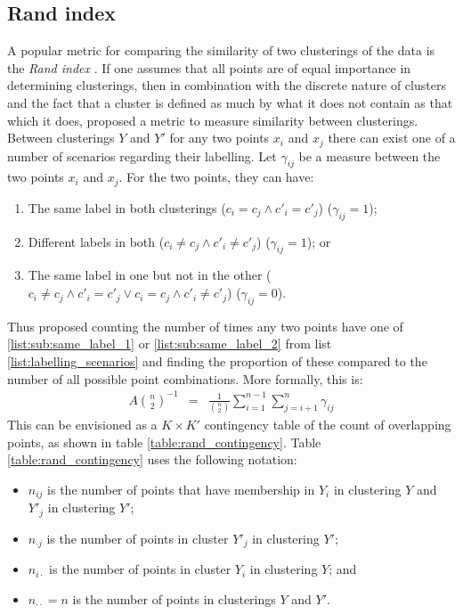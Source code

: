 \documentclass[12pt]{article} %
\begin{document}
	\subsection{Rand index} \label{sec:rand_index}
	A popular metric for comparing the similarity of two clusterings of the data is the \emph{Rand index} \citep{RandObjectiveCriteriaEvaluation1971}. If one assumes that all points are of equal importance in determining clusterings, then in combination with the discrete nature of clusters and the fact that a cluster is defined as much by what it does not contain as that which it does, \citet{RandObjectiveCriteriaEvaluation1971} proposed a metric to measure similarity between clusterings. Between clusterings $Y$ and $Y'$ for any two points $x_i$ and $x_j$ there can exist one of a number of scenarios regarding their labelling. Let $\gamma_{ij}$ be a measure between the two points $x_i$ and $x_j$. For the two points, they can have:
	\begin{enumerate} \label{list:labelling_scenarios}
		\item The same label in both clusterings ($c_i = c_j \land c'_i = c'_j$) ($\gamma_{ij}=1$); \label{list:sub:same_label_1}
		\item Different labels in both ($c_i \neq c_j \land c'_i \neq c'_j$) ($\gamma_{ij}=1$); or \label{list:sub:same_label_2}
		\item The same label in one but not in the other ($c_i \neq c_j \land c'_i = c'_j \lor c_i = c_j \land c'_i \neq c'_j$) ($\gamma_{ij}=0$). \label{list:sub:different_label}
	\end{enumerate}
	Thus \citet{RandObjectiveCriteriaEvaluation1971} proposed counting the number of times any two points have one of \ref{list:sub:same_label_1} or \ref{list:sub:same_label_2} from list \ref{list:labelling_scenarios} and finding the proportion of these compared to the number of all possible point combinations. More formally, this is:
	\begin{eqnarray} \label{eqn:rand_index}
	A \binom{n}{2}^{-1} & = & \frac{1}{\binom{n}{2}} \sum_{i=1}^{n-1}\sum_{j=i + 1}^n\gamma_{ij} 
	\end{eqnarray}
	This can be envisioned as a $K \times K'$ contingency table of the count of overlapping points, as shown in table \ref{table:rand_contingency}. Table \ref{table:rand_contingency} uses the following notation:
	\begin{itemize}
		\item $n_{ij}$ is the number of points that have membership in $Y_i$ in clustering $Y$ and $Y'_j$ in clustering $Y'$;
		\item $n_{\cdot j}$ is the number of points in cluster $Y'_j$ in clustering $Y'$;
		\item $n_{i \cdot}$ is the number of points in cluster $Y_i$ in clustering $Y$; and
		\item $n_{\cdot \cdot} = n$ is the number of points in clusterings $Y$ and $Y'$.
	\end{itemize}
\end{document}
